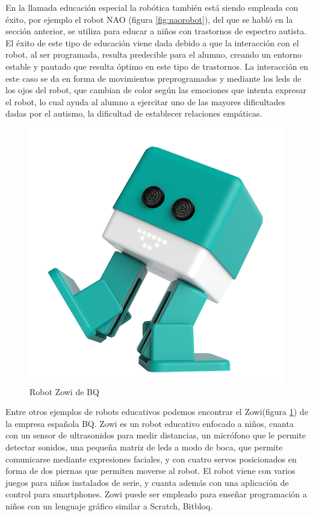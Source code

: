 En la llamada educación especial la robótica también está siendo empleada con éxito, por ejemplo el robot NAO (figura \ref{fig:naorobot}), del que se habló en la sección anterior, se utiliza para educar a niños con trastornos de espectro autista. El éxito de este tipo de educación viene dada debido a que la interacción con el robot, al ser programada, resulta predecible para el alumno, creando un entorno estable y pautado que resulta óptimo en este tipo de trastornos. La interacción en este caso se da en forma de movimientos preprogramados y mediante los leds de los ojos del robot, que cambian de color según las emociones que intenta expresar el robot, lo cual ayuda al alumno a ejercitar uno de las mayores dificultades dadas por el autismo, la dificultad de establecer relaciones empáticas.
 

 
   \begin{figure}[h]
	\centering
	\includegraphics[width=0.6\linewidth]{imagenes/zowi.png}
	\caption{Robot Zowi de BQ}
	\label{fig:zowi}
\end{figure} 



 Entre otros ejemplos de robots educativos podemos encontrar el Zowi(figura \ref{fig:zowi}) de la empresa española BQ. Zowi es un robot educativo enfocado a niños, cuanta con un sensor de ultrasonidos para medir distancias, un micrófono que le permite detectar sonidos, una pequeña matriz de leds a modo de boca, que permite comunicarse mediante expresiones faciales, y con cuatro servos posicionados en forma de dos piernas que permiten moverse al robot.
 El robot viene con varios juegos para niños instalados de serie, y cuanta además con una aplicación de control para smartphones. Zowi puede ser empleado para enseñar programación a niños con un lenguaje gráfico similar a Scratch\cite{scratch}, Bitbloq\cite{bitbloq}.
 
